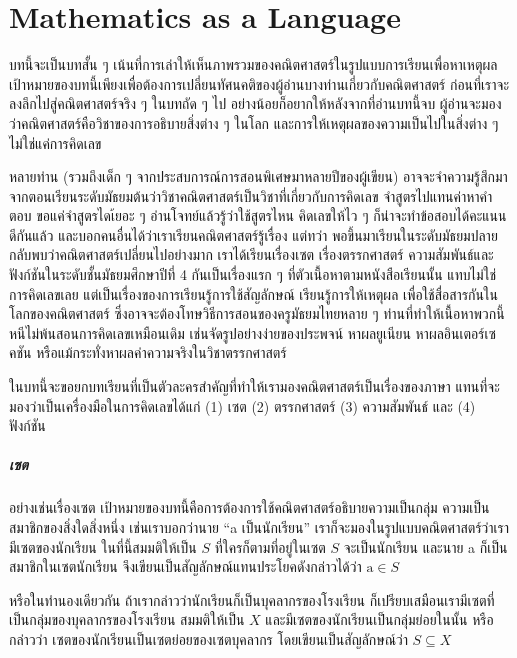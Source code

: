 \chapter{Mathematics as a Language}\label{chap:mathLang}

บทนี้จะเป็นบทสั้น ๆ เน้นที่การเล่าให้เห็นภาพรวมของคณิตศาสตร์ในรูปแบบการเรียนเพื่อหาเหตุผล เป้าหมายของบทนี้เพียงเพื่อต้องการเปลี่ยนทัศนคติของผู้อ่านบางท่านเกี่ยวกับคณิตศาสตร์ ก่อนที่เราจะลงลึกไปสู่คณิตศาสตร์จริง ๆ ในบทถัด ๆ ไป อย่างน้อยก็อยากให้หลังจากที่อ่านบทนี้จบ ผู้อ่านจะมองว่าคณิตศาสตร์คือวิชาของการอธิบายสิ่งต่าง ๆ ในโลก และการให้เหตุผลของความเป็นไปในสิ่งต่าง ๆ ไม่ใช่แค่การคิดเลข

หลายท่าน (รวมถึงเด็ก ๆ จากประสบการณ์การสอนพิเศษมาหลายปีของผู้เขียน) อาจจะจำความรู้สึกมาจากตอนเรียนระดับมัธยมต้นว่าวิชาคณิตศาสตร์เป็นวิชาที่เกี่ยวกับการคิดเลข จำสูตรไปแทนค่าหาคำตอบ ขอแค่จำสูตรไดเ้ยอะ ๆ อ่านโจทย์แล้วรู้ว่าใช้สูตรไหน คิดเลขให้ไว ๆ ก็น่าจะทำข้อสอบได้คะแนนดีกันแล้ว และบอกคนอื่นได้ว่าเราเรียนคณิตศาสตร์รู้เรื่อง แต่ทว่า พอขึ้นมาเรียนในระดับมัธยมปลาย กลับพบว่าคณิตศาสตร์เปลี่ยนไปอย่างมาก เราได้เรียนเรื่องเซต เรื่องตรรกศาสตร์ ความสัมพันธ์และฟังก์ชันในระดับชั้นมัธยมศึกษาปีที่ 4 กันเป็นเรื่องแรก ๆ ที่ตัวเนื้อหาตามหนังสือเรียนนั้น แทบไม่ใช่การคิดเลขเลย แต่เป็นเรื่องของการเรียนรู้การใช้สัญลักษณ์ เรียนรู้การให้เหตุผล เพื่อใช้สื่อสารกันในโลกของคณิตศาสตร์ ซึ่งอาจจะต้องโทษวิธีการสอนของครูมัธยมไทยหลาย ๆ ท่านที่ทำให้เนื้อหาพวกนี้หนีไม่พ้นสอนการคิดเลขเหมือนเดิม เช่นจัดรูปอย่างง่ายของประพจน์ หาผลยูเนียน หาผลอินเตอร์เซคชัน หรือแม้กระทั่งหาผลค่าความจริงในวิชาตรรกศาสตร์

ในบทนี้จะขอยกบทเรียนที่เป็นตัวละครสำคัญที่ทำให้เรามองคณิตศาสตร์เป็นเรื่องของภาษา แทนที่จะมองว่าเป็นเครื่องมือในการคิดเลขได้แก่ (1) เซต (2) ตรรกศาสตร์ (3) ความสัมพันธ์ และ (4) ฟังก์ชัน

\paragraph{เซต} อย่างเช่นเรื่องเซต เป้าหมายของบทนี้คือการต้องการใช้คณิตศาสตร์อธิบายความเป็นกลุ่ม ความเป็นสมาชิกของสิ่งใดสิ่งหนึ่ง เช่นเราบอกว่านาย ``a เป็นนักเรียน'' เราก็จะมองในรูปแบบคณิตศาสตร์ว่าเรามีเซตของนักเรียน ในที่นี้สมมติให้เป็น $S$ ที่ใครก็ตามที่อยู่ในเซต $S$ จะเป็นนักเรียน และนาย a ก็เป็นสมาชิกในเซตนักเรียน จึงเขียนเป็นสัญลักษณ์แทนประโยคดังกล่าวได้ว่า $\text{a} \in S$ 

หรือในทำนองเดียวกัน ถ้าเรากล่าวว่านักเรียนก็เป็นบุคลากรของโรงเรียน ก็เปรียบเสมือนเรามีเซตที่เป็นกลุ่มของบุคลากรของโรงเรียน สมมติให้เป็น $X$ และมีเซตของนักเรียนเป็นกลุ่มย่อยในนั้น หรือกล่าวว่า เซตของนักเรียนเป็นเซตย่อยของเซตบุคลากร โดยเขียนเป็นสัญลักษณ์ว่า $S \subseteq X$

